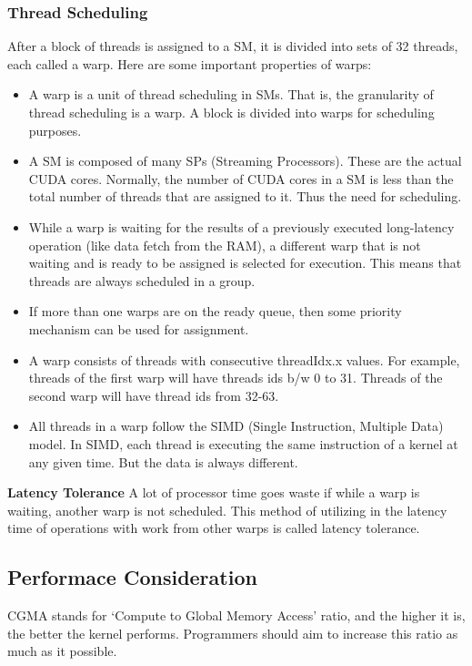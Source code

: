 \documentclass[../notes.tex]{subfiles}
\begin{document}
\subsubsection{Thread Scheduling}
After a block of threads is assigned to a SM, it is divided into sets of 32 threads, each called a warp. Here are some important properties of warps:

\begin{itemize}
\item A warp is a unit of thread scheduling in SMs. That is, the granularity of thread scheduling is a warp. A block is divided into warps for scheduling purposes.
\item A SM is composed of many SPs (Streaming Processors). These are the actual CUDA cores. Normally, the number of CUDA cores in a SM is less than the total number of threads that are assigned to it. Thus the need for scheduling.
\item While a warp is waiting for the results of a previously executed long-latency operation (like data fetch from the RAM), a different warp that is not waiting and is ready to be assigned is selected for execution. This means that threads are always scheduled in a group.
\item If more than one warps are on the ready queue, then some priority mechanism can be used for assignment.
\item A warp consists of threads with consecutive threadIdx.x values. For example, threads of the first warp will have threads ids b/w 0 to 31. Threads of the second warp will have thread ids from 32-63.
\item All threads in a warp follow the SIMD (Single Instruction, Multiple Data) model. In SIMD, each thread is executing the same instruction of a kernel at any given time. But the data is always different.
\end{itemize}

\textbf{Latency Tolerance}
A lot of processor time goes waste if while a warp is waiting, another warp is not scheduled. This method of utilizing in the latency time of operations with work from other warps is called latency tolerance.

\subsection{Performace Consideration}
CGMA stands for ‘Compute to Global Memory Access’ ratio, and the higher it is, the better the kernel performs. Programmers should aim to increase this ratio as much as it possible.
\end{document}
